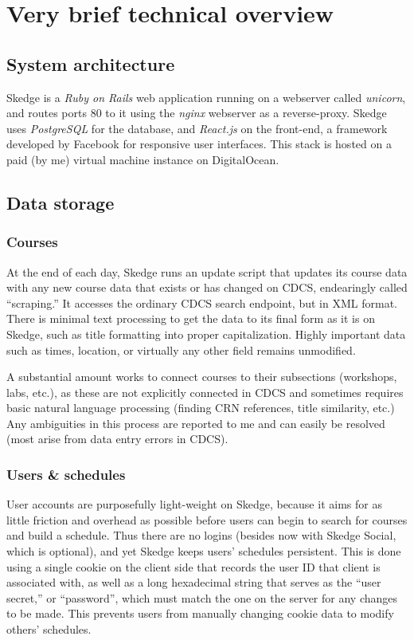 
\chapter{Very brief technical overview}

\section{System architecture}

Skedge is a \emph{Ruby on Rails} web application running on a webserver called \emph{unicorn}, and routes ports 80 to it using the \emph{nginx} webserver as a reverse-proxy. Skedge uses \emph{PostgreSQL} for the database, and \emph{React.js} on the front-end, a framework developed by Facebook for responsive user interfaces. This stack is hosted on a paid (by me) virtual machine instance on DigitalOcean. 

\section{Data storage}

\subsection{Courses}

At the end of each day, Skedge runs an update script that updates its course data with any new course data that exists or has changed on CDCS, endearingly called ``scraping.'' It accesses the ordinary CDCS search endpoint, but in XML format. There is minimal text processing to get the data to its final form as it is on Skedge, such as title formatting into proper capitalization. Highly important data such as times, location, or virtually any other field remains unmodified.

A substantial amount works to connect courses to their subsections (workshops, labs, etc.), as these are not explicitly connected in CDCS and sometimes requires basic natural language processing (finding CRN references, title similarity, etc.) Any ambiguities in this process are reported to me and can easily be resolved (most arise from data entry errors in CDCS).

\subsection{Users \& schedules}

User accounts are purposefully light-weight on Skedge, because it aims for as little friction and overhead as possible before users can begin to search for courses and build a schedule. Thus there are no logins (besides now with Skedge Social, which is optional), and yet Skedge keeps users' schedules persistent. This is done using a single cookie on the client side that records the user ID that client is associated with, as well as a long hexadecimal string that serves as the ``user secret,'' or ``password'', which must match the one on the server for any changes to be made. This prevents users from manually changing cookie data to modify others' schedules.

